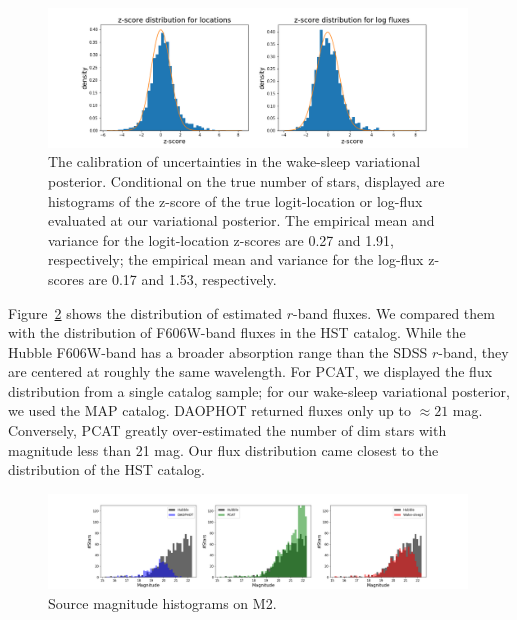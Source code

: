 \begin{figure}[ht]
    \centering
    \includegraphics[width=0.99\textwidth]{figures/z-score_calibration.png}
    \caption{The calibration of uncertainties in the wake-sleep variational posterior. 
    Conditional on the true number of stars, displayed are histograms of the z-score of the true logit-location or log-flux evaluated at our variational posterior. 
    The empirical mean and variance for the logit-location z-scores are 0.27 and 1.91, respectively; the empirical mean and variance for the log-flux z-scores are 0.17 and 1.53, respectively. 
}
    \label{fig:z-score_calibration}
\end{figure}

Figure~\ref{fig:luminosity_fun_m2} shows the distribution of estimated $r$-band fluxes. We compared them 
with the distribution of F606W-band fluxes in the HST catalog. While the Hubble F606W-band has a broader absorption range than the SDSS $r$-band, they are centered at roughly the same wavelength. For PCAT, we displayed the flux distribution from a single catalog sample; for our wake-sleep variational 
posterior, we used the MAP catalog. DAOPHOT returned fluxes only up to $\approx21$ mag.
Conversely, PCAT greatly over-estimated the number of dim stars with magnitude less than 21 mag. Our flux distribution came closest to the distribution of the HST catalog. 

\begin{figure}[ht]
    \centering
    \includegraphics[width=0.99\textwidth]{figures/luminosity_fun.png}
    \caption{Source magnitude histograms on M2. }
    \label{fig:luminosity_fun_m2}
\end{figure}

